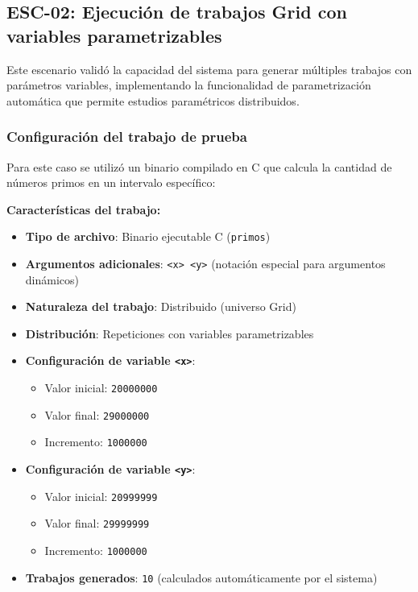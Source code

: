 \subsection{ESC-02: Ejecución de trabajos Grid con variables parametrizables}
\noindent

Este escenario validó la capacidad del sistema para generar múltiples trabajos con parámetros variables, implementando la funcionalidad de parametrización automática que permite estudios paramétricos distribuidos.

\subsubsection{Configuración del trabajo de prueba}
\noindent

Para este caso se utilizó un binario compilado en C que calcula la cantidad de números primos en un intervalo específico:

\textbf{Características del trabajo:}
\begin{itemize}
	\item \textbf{Tipo de archivo}: Binario ejecutable C (\texttt{primos})
	\item \textbf{Argumentos adicionales}: \texttt{<x> <y>} (notación especial para argumentos dinámicos)
	\item \textbf{Naturaleza del trabajo}: Distribuido (universo Grid)
	\item \textbf{Distribución}: Repeticiones con variables parametrizables
	\item \textbf{Configuración de variable \texttt{<x>}}:
	      \begin{itemize}
		      \item Valor inicial: \texttt{20000000}
		      \item Valor final: \texttt{29000000}
		      \item Incremento: \texttt{1000000}
	      \end{itemize}
	\item \textbf{Configuración de variable \texttt{<y>}}:
	      \begin{itemize}
		      \item Valor inicial: \texttt{20999999}
		      \item Valor final: \texttt{29999999}
		      \item Incremento: \texttt{1000000}
	      \end{itemize}
	\item \textbf{Trabajos generados}: \texttt{10} (calculados automáticamente por el sistema)
\end{itemize}

